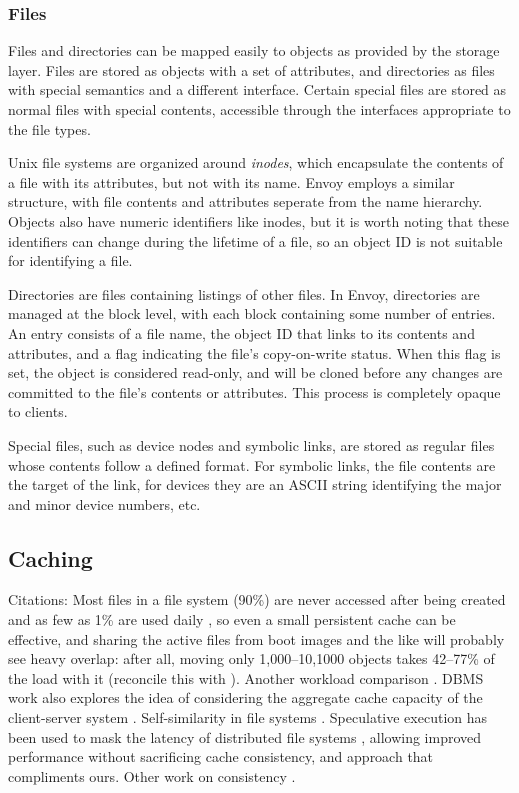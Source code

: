 \subsubsection{Files}\label{sec:directory-format}

Files and directories can be mapped easily to objects as provided by the storage layer. Files are stored as objects with a set of attributes, and directories as files with special semantics and a different interface. Certain special files are stored as normal files with special contents, accessible through the interfaces appropriate to the file types.

Unix file systems are organized around \emph{inodes}, which encapsulate the contents of a file with its attributes, but not with its name. Envoy employs a similar structure, with file contents and attributes seperate from the name hierarchy. Objects also have numeric identifiers like inodes, but it is worth noting that these identifiers can change during the lifetime of a file, so an object ID is not suitable for identifying a file.

Directories are files containing listings of other files. In Envoy, directories are managed at the block level, with each block containing some number of entries. An entry consists of a file name, the object ID that links to its contents and attributes, and a flag indicating the file's copy-on-write status. When this flag is set, the object is considered read-only, and will be cloned before any changes are committed to the file's contents or attributes. This process is completely opaque to clients.

Special files, such as device nodes and symbolic links, are stored as regular files whose contents follow a defined format. For symbolic links, the file contents are the target of the link, for devices they are an ASCII string identifying the major and minor device numbers, etc.

\subsection{Caching}

Citations: Most files in a file system (90\%) are never accessed after being created and as few as 1\% are used daily \cite{gibson98b}, so even a small persistent cache can be effective, and sharing the active files from boot images and the like will probably see heavy overlap: after all, moving only 1,000--10,1000 objects takes 42--77\% of the load with it \cite{klosterman} (reconcile this with \cite{muntz}). Another workload comparison \cite{roselli}. DBMS work also explores the idea of considering the aggregate cache capacity of the client-server system \cite{franklin}. Self-similarity in file systems \cite{gribble}. Speculative execution has been used to mask the latency of distributed file systems \cite{nightengale}, allowing improved performance without sacrificing cache consistency, and approach that compliments ours. Other work on consistency \cite{triantafillou,vilayannur}.

